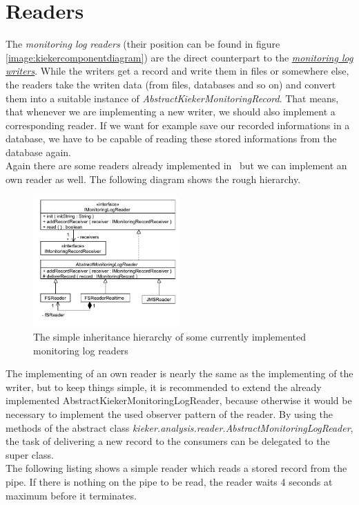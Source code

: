       \section{Readers}
	The \textit{monitoring log readers} (their position can be found in figure \ref{image:kiekercomponentdiagram}) are the direct counterpart to the \hyperlink{monitoringlogwriters}{\textit{monitoring log writers}}. While the writers get a record and write them in files or somewhere else, the readers take the writen data (from files, databases and so on) and convert them into a suitable instance of \textit{AbstractKiekerMonitoringRecord}. That means, that whenever we are implementing a new writer, we should also implement a corresponding reader. If we want for example save our recorded informations in a database, we have to be capable of reading these stored informations from the database again.\\
	Again there are some readers already implemented in \Kieker\ but we can implement an own reader as well. The following diagram shows the rough hierarchy.
	\begin{figure}[H]
	  \begin{center}
	    \includegraphics[width=0.5\textwidth]{kieker_readerimpls.pdf}
	    \caption{The simple inheritance hierarchy of some currently implemented monitoring log readers}
	    \label{image:readers}
	  \end{center}
	\end{figure}
	The implementing of an own reader is nearly the same as the implementing of the writer, but to keep things simple, it is recommended to extend the already implemented AbstractKiekerMonitoringLogReader, because otherwise it would be necessary to implement the used observer pattern of the reader. By using the methods of the abstract class \textit{kieker.analysis.reader.AbstractMonitoringLogReader}, the task of delivering a new record to the consumers can be delegated to the super class.\\
	The following listing shows a simple reader which reads a stored record from the pipe. If there is nothing on the pipe to be read, the reader waits 4 seconds at maximum before it terminates.
	\setJavaCodeListing
	\lstset{caption=MyReader.java}
	

